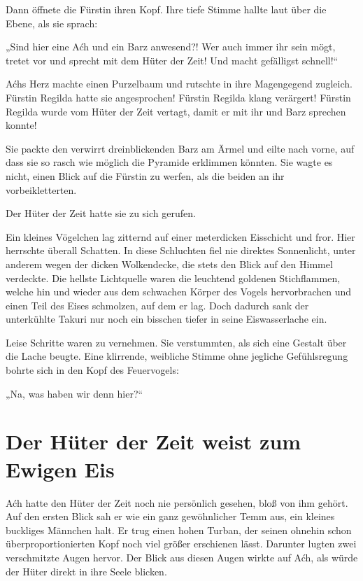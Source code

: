 Dann öffnete die Fürstin ihren Kopf. Ihre tiefe Stimme hallte laut über die Ebene, als sie sprach:

„Sind hier eine Aćh und ein Barz anwesend?! Wer auch immer ihr sein mögt, tretet vor und sprecht mit dem Hüter der Zeit! Und macht gefälligst schnell!“

Aćhs Herz machte einen Purzelbaum und rutschte in ihre Magengegend zugleich. Fürstin Regilda hatte sie angesprochen! Fürstin Regilda klang verärgert! Fürstin Regilda wurde vom Hüter der Zeit vertagt, damit er mit ihr und Barz sprechen konnte!

Sie packte den verwirrt dreinblickenden Barz am Ärmel und eilte nach vorne, auf dass sie so rasch wie möglich die Pyramide erklimmen könnten. Sie wagte es nicht, einen Blick auf die Fürstin zu werfen, als die beiden an ihr vorbeikletterten.

Der Hüter der Zeit hatte sie zu sich gerufen.



\trennzeichen



Ein kleines Vögelchen lag zitternd auf einer meterdicken Eisschicht und fror. Hier herrschte überall Schatten. In diese Schluchten fiel nie direktes Sonnenlicht, unter anderem wegen der dicken Wolkendecke, die stets den Blick auf den Himmel verdeckte. Die hellste Lichtquelle waren die leuchtend goldenen Stichflammen, welche hin und wieder aus dem schwachen Körper des Vogels hervorbrachen und einen Teil des Eises schmolzen, auf dem er lag. Doch dadurch sank der unterkühlte Takuri nur noch ein bisschen tiefer in seine Eiswasserlache ein.

Leise Schritte waren zu vernehmen. Sie verstummten, als sich eine Gestalt über die Lache beugte. Eine klirrende, weibliche Stimme ohne jegliche Gefühlsregung bohrte sich in den Kopf des Feuervogels:

„Na, was haben wir denn hier?“









\newpage
\section{Der Hüter der Zeit weist zum Ewigen Eis}

Aćh hatte den Hüter der Zeit noch nie persönlich gesehen, bloß von ihm gehört. Auf den ersten Blick sah er wie ein ganz gewöhnlicher Temm aus, ein kleines buckliges Männchen halt. Er trug einen hohen Turban, der seinen ohnehin schon überproportionierten Kopf noch viel größer erschienen lässt. Darunter lugten zwei verschmitzte Augen hervor. Der Blick aus diesen Augen wirkte auf Aćh, als würde der Hüter direkt in ihre Seele blicken.

